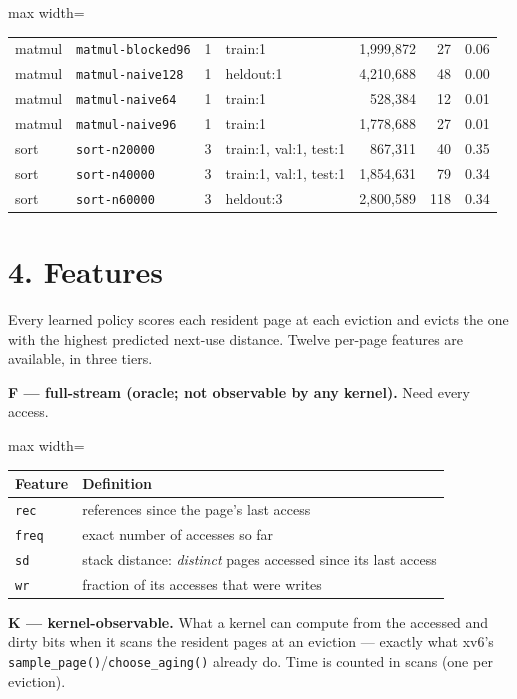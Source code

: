 \documentclass[10pt,a4paper]{article}
\newcommand{\code}[1]{\texttt{#1}}
\begin{document}
\begin{center}
\begin{adjustbox}{max width=\linewidth}
\begin{tabular}{llrlrrr}
matmul & \code{matmul-blocked96} & 1 & train:1 & 1,999,872 & 27 & 0.06 \\
matmul & \code{matmul-naive128} & 1 & heldout:1 & 4,210,688 & 48 & 0.00 \\
matmul & \code{matmul-naive64} & 1 & train:1 & 528,384 & 12 & 0.01 \\
matmul & \code{matmul-naive96} & 1 & train:1 & 1,778,688 & 27 & 0.01 \\
sort & \code{sort-n20000} & 3 & train:1, val:1, test:1 & 867,311 & 40 & 0.35 \\
sort & \code{sort-n40000} & 3 & train:1, val:1, test:1 & 1,854,631 & 79 & 0.34 \\
sort & \code{sort-n60000} & 3 & heldout:3 & 2,800,589 & 118 & 0.34 \\
\bottomrule
\end{tabular}
\end{adjustbox}
\end{center}

\section*{4. Features}

Every learned policy scores each resident page at each eviction and evicts the one with the highest predicted next-use distance. Twelve per-page features are available, in three tiers.

\textbf{F — full-stream (oracle; not observable by any kernel).} Need every access.

\begin{center}\footnotesize
\begin{adjustbox}{max width=\linewidth}
\begin{tabular}{ll}
\toprule
\textbf{Feature} & \textbf{Definition} \\ \midrule
\code{rec} & references since the page's last access \\
\code{freq} & exact number of accesses so far \\
\code{sd} & stack distance: \emph{distinct} pages accessed since its last access \\
\code{wr} & fraction of its accesses that were writes \\
\bottomrule
\end{tabular}
\end{adjustbox}
\end{center}

\textbf{K — kernel-observable.} What a kernel can compute from the accessed and dirty bits when it scans the resident pages at an eviction — exactly what xv6's \code{sample\_\allowbreak{}page()}/\code{choose\_\allowbreak{}aging()} already do. Time is counted in scans (one per eviction).
\end{document}
